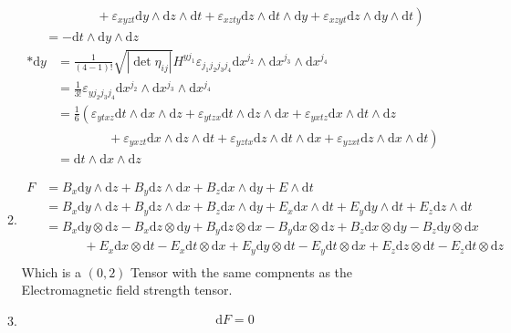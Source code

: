 \documentclass[12pt,a4]{article}
\newcommand{\e}{\mathrm{d}}
\begin{document}
\begin{enumerate}
\begin{enumerate}
\begin{align*}
                 &\qquad \qquad +\left. \varepsilon_{x y z t} \e y \wedge \e z \wedge \e t + \varepsilon_{x z t y} \e z \wedge \e t \wedge \e y + \varepsilon_{x z y t} \e z \wedge \e y \wedge \e t\right)\\
                 &= -  \e t \wedge \e y \wedge \e z
        \end{align*}
        \begin{align*}
          *\e y
                 &= \frac{1}{(4 - 1)!} \sqrt{|\det{\eta_{ij}}|} H^{y j_1} \varepsilon_{j_1 j_2 j_3 j_4} \e x^{j_2} \wedge \e x^{j_3} \wedge \e x^{j_4}\\
                 &= \frac{1}{3!}  \varepsilon_{y j_2 j_3 j_4} \e x^{j_2} \wedge \e x^{j_3} \wedge \e x^{j_4}\\
                 &= \frac{1}{6}  \left(\varepsilon_{y t x z} \e t \wedge \e x \wedge \e z + \varepsilon_{y t z x} \e t \wedge \e z \wedge \e x + \varepsilon_{y x t z} \e x \wedge \e t \wedge \e z\right.\\
                 &\qquad \qquad +\left. \varepsilon_{y x z t} \e x \wedge \e z \wedge \e t + \varepsilon_{y z t x} \e z \wedge \e t \wedge \e x + \varepsilon_{y z x t} \e z \wedge \e x \wedge \e t\right)\\
                 &=  \e t \wedge \e x \wedge \e z
        \end{align*}
      \item
        \begin{align*}
          F &= B_x \e y \wedge \e z + B_y \e z \wedge \e x + B_z \e x \wedge \e y + E \wedge \e t\\
            &= B_x \e y \wedge \e z + B_y \e z \wedge \e x + B_z \e x \wedge \e y + E_x \e x \wedge \e t  + E_y \e y \wedge \e t  + E_z \e z \wedge \e t\\
            &= B_x \e y \otimes \e z - B_x \e z \otimes \e y + B_y \e z \otimes \e x - B_y \e x \otimes \e z + B_z \e x \otimes \e y - B_z \e y \otimes \e x\\
            &\qquad \quad + E_x \e x \otimes \e t - E_x \e t \otimes \e x + E_y \e y \otimes \e t - E_y \e t \otimes \e x + E_z \e z \otimes \e t - E_z \e t \otimes \e z\\
        \end{align*}
        Which is a $(0,2)$ Tensor with the same compnents as the Electromagnetic field strength tensor.
      \item
        \begin{align*}
                          &\e F = 0\\

\end{align*}
\end{enumerate}
\end{enumerate}
\end{document}
